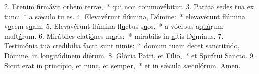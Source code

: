2. Etenim firmávit \uline{o}rbem t\uline{e}rræ,~* qui non c\uline{o}mmov\uline{é}bitur.
3. Paráta sedes t\uline{u}a \uline{e}x tunc:~* a s\uline{ǽ}culo t\uline{u} es.
4. Elevavérunt flúmina, D\uline{ó}m\uline{i}ne:~* elevavérunt flúmina v\uline{o}cem s\uline{u}am.
5. Elevavérunt flúmina fl\uline{u}ctus s\uline{u}os,~* a vócibus a\uline{quá}rum mult\uline{á}rum.
6. Mirábiles elati\uline{ó}nes m\uline{a}ris:~* mirábilis in \uline{a}ltis D\uline{ó}minus.
7. Testimónia tua credibília f\uline{a}cta sunt n\uline{i}mis:~* domum tuam decet sanctitúdo, Dómine, in longitúdin\uline{e}m di\uline{é}rum.
8. Glória Patri, et F\uline{í}l\uline{i}o,~* et Spir\uline{í}tui S\uline{a}ncto.
9. Sicut erat in princípio, et n\uline{u}nc, et s\uline{e}mper,~* et in sǽcula sæcul\uline{ó}rum. \uline{A}men.
